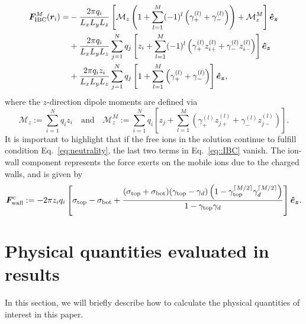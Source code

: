 \begin{equation}\label{eq::IBC}
\begin{split}
\bm{F}_{\text{IBC}}^{M}(\bm{r}_i)=&-\frac{2\pi q_{i}}{L_xL_yL_z}\left[\mathcal{M}_{z}\left(1+\sum_{l=1}^{M}(-1)^{l}\left(\gamma_{+}^{(l)}+\gamma_{-}^{(l)}\right)\right)+\mathcal{M}_{z}^{M}\right]\boldsymbol{\hat e_z}\\
&+\frac{2\pi q_i}{L_xL_yL_z}\sum_{j=1}^{N}q_j\left[z_i+\sum_{l=1}^{M}(-1)^{l}\left(\gamma_{+}^{(l)}z_{i+}^{(l)}+\gamma_{-}^{(l)}z_{i-}^{(l)}\right)\right]\boldsymbol{\hat e_z}\\
&+\frac{2\pi q_iz_i}{L_xL_yL_z}\sum_{j=1}^{N}q_j\left[1+\sum_{l=1}^{M}\left(\gamma_{+}^{(l)}+\gamma_{-}^{(l)}\right)\right]\boldsymbol{\hat e_z},
\end{split}
\end{equation}
where the $z$-direction dipole moments are defined via
\begin{equation}
\mathcal{M}_{z}:=\sum_{i=1}^{N}q_iz_i\quad\text{and}\quad \mathcal{M}_{z}^{M}:=\sum_{i=1}^{N}q_i\left[z_{j}+\sum_{l=1}^{M}\left(\gamma_{+}^{(l)}z_{j+}^{(l)}+\gamma_{-}^{(l)}z_{j-}^{(l)}\right)\right].
\end{equation}
It is important to highlight that if the free ions in the solution continue to fulfill condition Eq.~\eqref{eq:neutrality}, the last two terms in Eq.~\eqref{eq::IBC} vanish. 
The ion-wall component represents the force exerts on the mobile ions due to the charged walls, and is given by
\begin{equation}
\bm{F}_{\text{wall}}^{\text{c}}:=-2\pi z_{i}q_{i}\left[\sigma_{\text{top}}-\sigma_{\text{bot}}+\frac{(\sigma_{\text{top}}+\sigma_{\text{bot}})(\gamma_{\text{top}}-\gamma_{d})\left(1-\gamma_{\text{top}}^{\lceil M/2 \rceil}\gamma_{d}^{\lceil M/2 \rceil}\right)}{1-\gamma_{\text{top}}\gamma_{d}}\right]\boldsymbol{\hat e_z}.
\end{equation}

\section{Physical quantities evaluated in results}\label{Sec::phyquan}

In this section, we will briefly describe how to calculate the physical quantities of interest in this paper.


